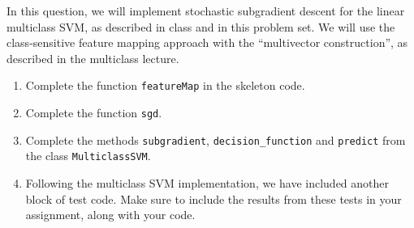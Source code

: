 \documentclass{article}
\theoremstyle{plain}
\theoremstyle{definition}
\begin{document}
In this question, we will implement stochastic subgradient descent
for the linear multiclass SVM, as described in class and in this
problem set. We will use the class-sensitive feature mapping approach
with the ``multivector construction'', as described in the multiclass lecture.
\begin{enumerate}
  \setcounter{enumi}{\value{saveenum}}
\item Complete the function \texttt{featureMap} in the skeleton code.
\item Complete the function \texttt{sgd}.
\item Complete the methods \texttt{subgradient}, \texttt{decision\_function} and \texttt{predict} from the class \texttt{MulticlassSVM}. 
\item Following the multiclass
SVM implementation, we have included another block of test code. Make
sure to include the results from these tests in your assignment, along
with your code. 
\setcounter{saveenum}{\value{enumi}}
\end{enumerate}
\end{document}
